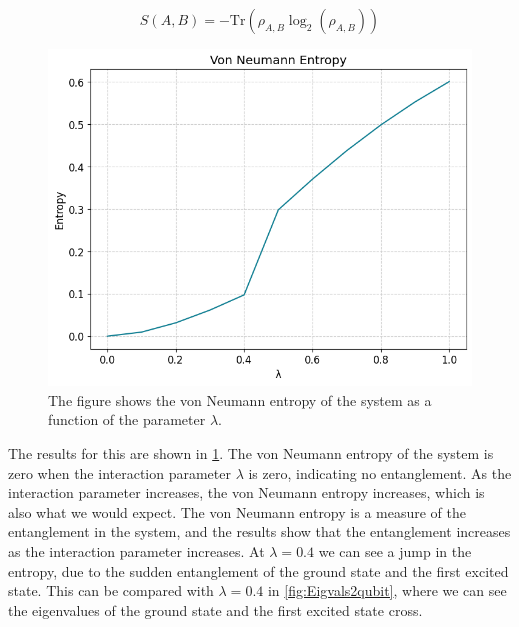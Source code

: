\documentclass[11pt, letterpaper, titlepage]{article}
\begin{document}
\[
S(A,B) = -\text{Tr}(ρ_{A,B}\log_2(ρ_{A,B}))
\]
\begin{figure}
        \begin{center}
                \includegraphics[scale=0.6]{VonNeumann.png}
        \end{center}
        \caption{The figure shows the von Neumann entropy of the system as a function of the parameter \(λ\).}
        \label{fig:VonNeumann}
\end{figure}
The results for this are shown in \ref{fig:VonNeumann}. The von Neumann entropy of the system is zero when the interaction parameter \(λ\) is zero, indicating no entanglement. As the interaction parameter increases, the von Neumann entropy increases, which is also what we would expect. The von Neumann entropy is a measure of the entanglement in the system, and the results show that the entanglement increases as the interaction parameter increases. At \(λ=0.4\) we can see a jump in the entropy, due to the sudden entanglement of the ground state and the first excited state. This can be compared with \(λ=0.4\) in \ref{fig:Eigvals2qubit}, where we can see the eigenvalues of the ground state and the first excited state cross. \newline
\end{document}

